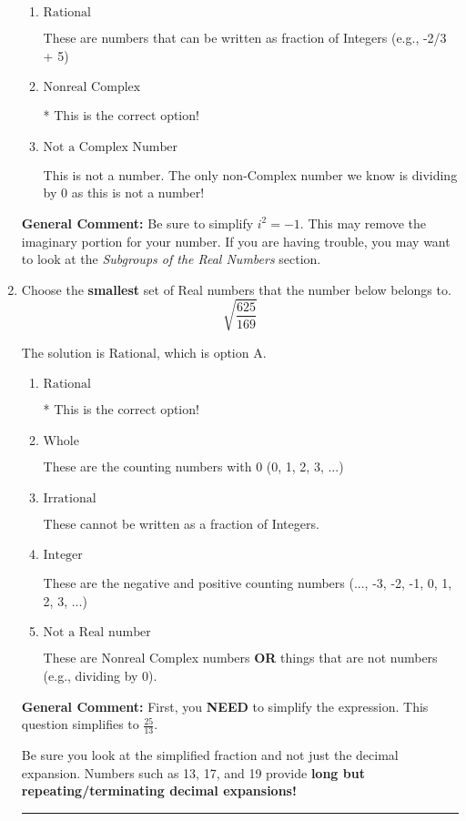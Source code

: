 \documentclass{extbook}[14pt]
\newcommand{\litem}[1]{\item #1

\rule{\textwidth}{0.4pt}}
\begin{document}
\begin{enumerate}
{\begin{enumerate}[label=\Alph*.]
This is a Complex number $(a+bi)$ that \textbf{only} has an imaginary part like $2i$.
\item \( \text{Rational} \)

These are numbers that can be written as fraction of Integers (e.g., -2/3 + 5)
\item \( \text{Nonreal Complex} \)

* This is the correct option!
\item \( \text{Not a Complex Number} \)

This is not a number. The only non-Complex number we know is dividing by 0 as this is not a number!
\end{enumerate}

\textbf{General Comment:} Be sure to simplify $i^2 = -1$. This may remove the imaginary portion for your number. If you are having trouble, you may want to look at the \textit{Subgroups of the Real Numbers} section.
}
\litem{
Choose the \textbf{smallest} set of Real numbers that the number below belongs to.
\[ \sqrt{\frac{625}{169}} \]

The solution is \( \text{Rational} \), which is option A.\begin{enumerate}[label=\Alph*.]
\item \( \text{Rational} \)

* This is the correct option!
\item \( \text{Whole} \)

These are the counting numbers with 0 (0, 1, 2, 3, ...)
\item \( \text{Irrational} \)

These cannot be written as a fraction of Integers.
\item \( \text{Integer} \)

These are the negative and positive counting numbers (..., -3, -2, -1, 0, 1, 2, 3, ...)
\item \( \text{Not a Real number} \)

These are Nonreal Complex numbers \textbf{OR} things that are not numbers (e.g., dividing by 0).
\end{enumerate}

\textbf{General Comment:} First, you \textbf{NEED} to simplify the expression. This question simplifies to $\frac{25}{13}$. 
 
 Be sure you look at the simplified fraction and not just the decimal expansion. Numbers such as 13, 17, and 19 provide \textbf{long but repeating/terminating decimal expansions!} 
 
}
\end{enumerate}
\end{document}
